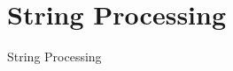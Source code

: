 \section{String Processing}

\begin{frame}{}
  \Large
  \centering
  \color{bleu}
  String Processing
\end{frame}